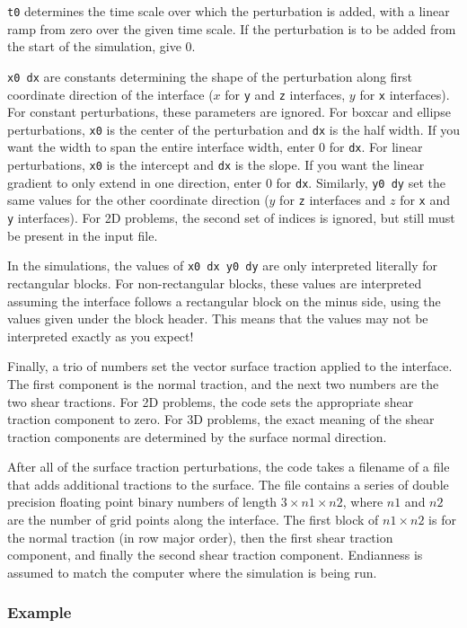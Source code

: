 \documentclass[12pt]{article}   	%
\begin{document}
{\tt t0} determines the time scale over which the perturbation is added, with a linear ramp from zero over the given time scale. If the perturbation is to be added from the start of the simulation, give 0.

{\tt x0 dx} are constants determining the shape of the perturbation along first coordinate direction of the interface ($x$ for {\tt y} and {\tt z} interfaces, $y$ for {\tt x} interfaces). For constant perturbations, these parameters are ignored. For boxcar and ellipse perturbations, {\tt x0} is the center of the perturbation and {\tt dx} is the half width. If you want the width to span the entire interface width, enter 0 for {\tt dx}. For linear perturbations, {\tt x0} is the intercept and {\tt dx} is the slope. If you want the linear gradient to only extend in one direction, enter 0 for {\tt dx}. Similarly, {\tt y0 dy} set the same values for the other coordinate direction ($y$ for {\tt z} interfaces and $z$ for {\tt x} and {\tt y} interfaces). For 2D problems, the second set of indices is ignored, but still must be present in the input file.

In the simulations, the values of {\tt x0 dx y0 dy} are only interpreted literally for rectangular blocks. For non-rectangular blocks, these values are interpreted assuming the interface follows a rectangular block on the minus side, using the values given under the block header. This means that the values may not be interpreted exactly as you expect!

Finally, a trio of numbers set the vector surface traction applied to the interface. The first component is the normal traction, and the next two numbers are the two shear tractions. For 2D problems, the code sets the appropriate shear traction component to zero. For 3D problems, the exact meaning of the shear traction components are determined by the surface normal direction.

After all of the surface traction perturbations, the code takes a filename of a file that adds additional tractions to the surface. The file contains a series of double precision floating point binary numbers of length $3\times n1 \times n2$, where $n1$ and $n2$ are the number of grid points along the interface. The first block of $n1\times n2$ is for the normal traction (in row major order), then the first shear traction component, and finally the second shear traction component. Endianness is assumed to match the computer where the simulation is being run.

\subsubsection{Example}
\end{document}
